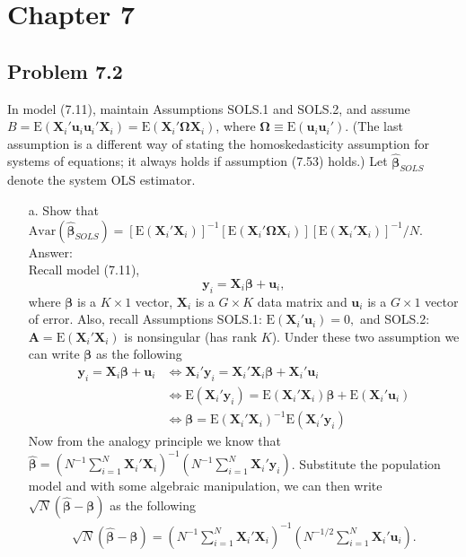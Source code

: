 \documentclass[10pt]{article}
\newcommand{\E}{\text{E}}
\newcommand{\Av}{\text{Avar}}
\begin{document}
\section*{Chapter 7}
\subsection*{Problem 7.2}
In model (7.11), maintain Assumptions SOLS.1 and SOLS.2, and assume $\textbf{}B=\E(\textbf{X}_i'\textbf{u}_i\textbf{u}_i'\textbf{X}_i)=\E(\textbf{X}_i'\pmb{\Omega}\textbf{X}_i)$, where $\pmb{\Omega}\equiv \E(\textbf{u}_i\textbf{u}_i').$ (The last assumption is a different way of stating the homoskedasticity assumption for systems of equations; it always holds if assumption (7.53) holds.) Let $\hat{\pmb{\beta}}_{SOLS}$ denote the system OLS estimator.
\begin{enumerate}
\item[a.] Show that $\Av(\hat{\pmb{\beta}}_{SOLS})=[\E(\textbf{X}_i'\textbf{X}_i)]^{-1}[\E(\textbf{X}_i'\pmb{\Omega}\textbf{X}_i)][\E(\textbf{X}_i'\textbf{X}_i)]^{-1}/N.$
\\ Answer:\\
Recall model (7.11),
\[\textbf{y}_i=\textbf{X}_i\pmb{\beta}+\textbf{u}_i,\]
where $\pmb{\beta}$ is a $K\times 1$ vector, $\textbf{X}_i$ is a $G\times K$ data matrix and $\textbf{u}_i$ is a $G\times 1$ vector of error. Also, recall Assumptions SOLS.1: $\E(\textbf{X}_i'\textbf{u}_i)=0,$ and SOLS.2: $\textbf{A}=\E(\textbf{X}_i'\textbf{X}_i)$ is nonsingular (has rank $K$). Under these two assumption we can write $\pmb{\beta}$ as the following
\begin{align*}
    \textbf{y}_i=\textbf{X}_i\pmb{\beta}+\textbf{u}_i &\Leftrightarrow \textbf{X}_i'\textbf{y}_i=\textbf{X}_i'\textbf{X}_i\pmb{\beta}+\textbf{X}_i'\textbf{u}_i \\
    &\Leftrightarrow \E( \textbf{X}_i'\textbf{y}_i)=\E(\textbf{X}_i'\textbf{X}_i)\pmb{\beta}+\E(\textbf{X}_i'\textbf{u}_i) \\
    &\Leftrightarrow \pmb{\beta}=\E(\textbf{X}_i'\textbf{X}_i)^{-1}\E( \textbf{X}_i'\textbf{y}_i)
\end{align*}
Now from the analogy principle we know that $\hat{\pmb{\beta}}=(N^{-1}\sum_{i=1}^N \textbf{X}_i'\textbf{X}_i)^{-1}(N^{-1}\sum_{i=1}^N \textbf{X}_i'\textbf{y}_i)$. Substitute the population model and with some algebraic manipulation, we can then write $\sqrt{N}(\hat{\pmb{\beta}}-\pmb{\beta})$ as the following
\begin{align*}
    \sqrt{N}(\hat{\pmb{\beta}}-\pmb{\beta})=(N^{-1}\sum_{i=1}^N \textbf{X}_i'\textbf{X}_i)^{-1}(N^{-1/2}\sum_{i=1}^N \textbf{X}_i'\textbf{u}_i).

\end{align*}
\end{enumerate}
\end{document}
